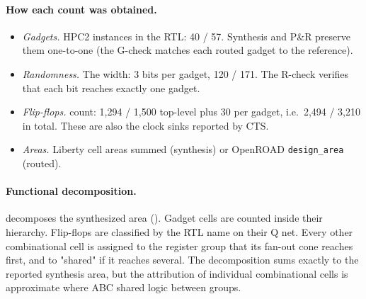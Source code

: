 \paragraph{How each count was obtained.}
\begin{itemize}
  \item \emph{Gadgets.} HPC2 instances in the RTL: 40 / 57. Synthesis and P\&R preserve them one-to-one (the G-check matches each routed gadget to the reference).
  \item \emph{Randomness.} The  width: 3 bits per gadget, 120 / 171. The R-check verifies that each bit reaches exactly one gadget.
  \item \emph{Flip-flops.}  count: 1,294 / 1,500 top-level plus 30 per gadget, i.e.\ 2,494 / 3,210 in total. These are also the clock sinks reported by CTS.
  \item \emph{Areas.} Liberty cell areas summed (synthesis) or OpenROAD \texttt{design\_area} (routed).
\end{itemize}

\paragraph{Functional decomposition.}  decomposes the synthesized area (). Gadget cells are counted inside their hierarchy. Flip-flops are classified by the RTL name on their Q net. Every other combinational cell is assigned to the register group that its fan-out cone reaches first, and to "shared" if it reaches several. The decomposition sums exactly to the reported synthesis area, but the attribution of individual combinational cells is approximate where ABC shared logic between groups.


